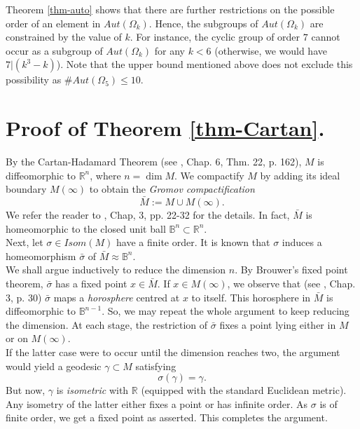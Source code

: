 \documentclass[12pt,a4paper]{article}
\begin{document}
    Theorem \ref{thm-auto} shows that there are further restrictions on the possible order of an element in $Aut(\Omega_{k})$. Hence, the subgroups of $Aut(\Omega_{k})$ are constrained by the value of $k$. For instance, the cyclic group of order $7$ cannot occur as a subgroup of $Aut(\Omega_{k})$ for any $k < 6$ (otherwise, we would have $7 | (k^{3}-k)$). Note that the upper bound mentioned above does not exclude this possibility as $\#Aut(\Omega_{5})\leq 10$.
\section{Proof of Theorem \ref{thm-Cartan}.}
\indent

    By the Cartan-Hadamard Theorem (see \cite{petersen}, Chap. 6, Thm. 22, p. 162), $M$ is diffeomorphic to $\mathbb{R}^{n}$, where $n=\dim M$. We compactify $M$ by adding its ideal boundary $M(\infty)$ to obtain the \textit{Gromov compactification}
    \begin{equation*}
     \bar{M}:= M \cup M(\infty).
    \end{equation*}
    We refer the reader to \cite{gromov}, Chap, 3, pp. 22-32 for the details. In fact, $\bar{M}$ is homeomorphic to the closed unit ball $\mathbb{B}^{n}\subset \mathbb{R}^{n}$.\\

    Next, let $\sigma \in Isom(M)$ have a finite order. It is known that $\sigma$ induces a homeomorphism $\bar{\sigma}$ of $\bar{M}\approx \mathbb{B}^{n}$.\\

    We shall argue inductively to reduce the dimension $n$. By Brouwer's fixed point theorem, $\bar{\sigma}$ has a fixed point $x \in\bar{M}$. If $x \in M(\infty)$, we observe that (see \cite{gromov}, Chap. 3, p. 30) $\bar{\sigma}$ maps a \textit{horosphere} centred at $x$ to itself. This horosphere in $\bar{M}$ is diffeomorphic to $\mathbb{B}^{n-1}$. So, we may repeat the whole argument to keep reducing the dimension. At each stage, the restriction of $\bar{\sigma}$ fixes a point lying either in $M$ or on $M(\infty)$. \\

    If the latter case were to occur until the dimension reaches two, the argument would yield a geodesic $\gamma \subset M$ satisfying
    \begin{equation*}
     \sigma(\gamma)=\gamma.
    \end{equation*}
    But now, $\gamma$ is \textit{isometric} with $\mathbb{R}$ (equipped with the standard Euclidean metric). Any isometry of the latter either fixes a point or has infinite order. As $\sigma$ is of finite order, we get a fixed point as asserted. This completes the argument.
\end{document}
